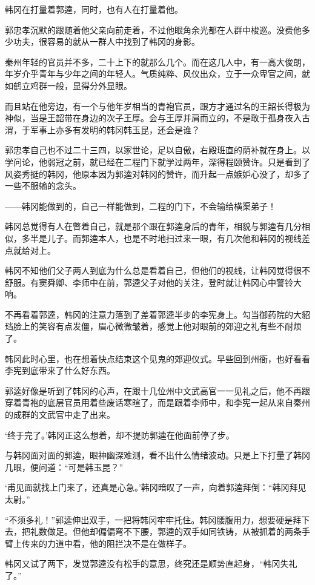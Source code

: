 韩冈在打量着郭逵，同时，也有人在打量着他。

郭忠孝沉默的跟随着他父亲向前走着，不过他眼角余光都在人群中梭巡。没费他多少功夫，很容易的就从一群人中找到了韩冈的身影。

秦州年轻的官员并不多，二十上下的就那么几个。而在这几人中，有一高大俊朗，年岁介乎青年与少年之间的年轻人。气质纯粹、风仪出众，立于一众卑官之间，就如鹤立鸡群一般，显得分外显眼。

而且站在他旁边，有一个与他年岁相当的青袍官员，跟方才通过名的王韶长得极为神似，当是王韶带在身边的次子王厚。会与王厚并肩而立的，不是敢于孤身夜入古渭，于军事上亦多有发明的韩冈韩玉昆，还会是谁？

郭忠孝自己也不过二十三四，以家世论，足以自傲，右殿班直的荫补就在身上。以学问论，他弱冠之前，就已经在二程门下就学过两年，深得程颐赞许。只是看到了风姿秀挺的韩冈，他原本因为郭逵对韩冈的赞许，而升起一点嫉妒心没了，却多了一些不服输的念头。

——韩冈能做到的，自己一样能做到，二程的门下，不会输给横渠弟子！

韩冈总觉得有人在瞥着自己，就是那个跟在郭逵身后的青年，相貌与郭逵有几分相似，多半是儿子。而郭逵本人，也是不时地扫过来一眼，有几次他和韩冈的视线差点就给对上。

韩冈不知他们父子两人到底为什么总是看着自己，但他们的视线，让韩冈觉得很不舒服。有窦舜卿、李师中在前，郭逵父子对他的关注，登时就让韩冈心中警铃大响。

不再看着郭逵，韩冈的注意力落到了差着郭逵半步的李宪身上。勾当御药院的大貂珰脸上的笑容有点发僵，眉心微微皱着，感觉上他对眼前的郊迎之礼有些不耐烦了。

韩冈此时心里，也在想着快点结束这个见鬼的郊迎仪式。早些回到州衙，也好看看李宪到底带来了什么好东西。

郭逵好像是听到了韩冈的心声，在跟十几位州中文武高官一一见礼之后，他不再跟穿着青袍的底层官员用着些废话寒暄了，而是跟着李师中，和李宪一起从来自秦州的成群的文武官中走了出来。

‘终于完了。’韩冈正这么想着，却不提防郭逵在他面前停了步。

与韩冈面对面的郭逵，眼神幽深难测，看不出什么情绪波动。只是上下打量了韩冈几眼，便问道：“可是韩玉昆？”

‘甫见面就找上门来了，还真是心急。’韩冈暗叹了一声，向着郭逵拜倒：“韩冈拜见太尉。”

“不须多礼！”郭逵伸出双手，一把将韩冈牢牢托住。韩冈腰腹用力，想要硬是拜下去，把礼数做足。但他却偏偏弯不下腰，郭逵的双手如同铁铸，从被抓着的两条手臂上传来的力道中看，他的阻拦决不是在做样子。

韩冈又试了两下，发觉郭逵没有松手的意思，终究还是顺势直起身，“韩冈失礼了。”

